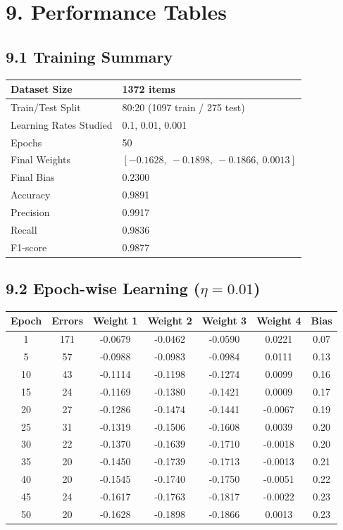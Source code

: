 \documentclass[11pt]{article}
\begin{document}
\FloatBarrier

\section*{9. Performance Tables}

\subsection*{9.1 Training Summary}

\begin{tabular}{|p{6cm}|p{7cm}|}
\hline
Dataset Size & 1372 items\\
\hline
Train/Test Split & 80:20 (1097 train / 275 test)\\
\hline
Learning Rates Studied & 0.1, 0.01, 0.001\\
\hline
Epochs & 50\\
\hline
Final Weights  & $[-0.1628,\ -0.1898,\ -0.1866,\ 0.0013]$\\
\hline
Final Bias  & $0.2300$\\
\hline
Accuracy & 0.9891\\
\hline
Precision & 0.9917\\
\hline
Recall & 0.9836\\
\hline
F1-score & 0.9877\\
\hline
\end{tabular}

\vspace{3mm}

\subsection*{9.2 Epoch-wise Learning ($\eta = 0.01$)}

\begin{center}
\begin{tabular}{|c|c|c|c|c|c|c|}
\hline
Epoch & Errors & Weight 1 & Weight 2 & Weight 3 & Weight 4 & Bias\\
\hline
1  & 171 & -0.0679 & -0.0462 & -0.0590 &  0.0221 & 0.07\\
5  & 57  & -0.0988 & -0.0983 & -0.0984 &  0.0111 & 0.13\\
10 & 43  & -0.1114 & -0.1198 & -0.1274 &  0.0099 & 0.16\\
15 & 24  & -0.1169 & -0.1380 & -0.1421 &  0.0009 & 0.17\\
20 & 27  & -0.1286 & -0.1474 & -0.1441 & -0.0067 & 0.19\\
25 & 31  & -0.1319 & -0.1506 & -0.1608 &  0.0039 & 0.20\\
30 & 22  & -0.1370 & -0.1639 & -0.1710 & -0.0018 & 0.20\\
35 & 20  & -0.1450 & -0.1739 & -0.1713 & -0.0013 & 0.21\\
40 & 20  & -0.1545 & -0.1740 & -0.1750 & -0.0051 & 0.22\\
45 & 24  & -0.1617 & -0.1763 & -0.1817 & -0.0022 & 0.23\\
50 & 20  & -0.1628 & -0.1898 & -0.1866 &  0.0013 & 0.23\\
\hline
\end{tabular}
\end{center}
\end{document}
